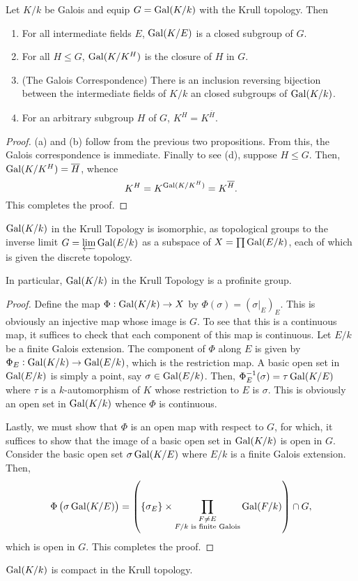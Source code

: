 \begin{theorem}[Krull]
    Let $K/k$ be Galois and equip $G = \operatorname{Gal}(K/k)$ with the Krull topology. Then 
    \begin{enumerate}[label=(\alph*)]
        \item For all intermediate fields $E$, $\operatorname{Gal}(K/E)$ is a closed subgroup of $G$.
        \item For all $H\le G$, $\operatorname{Gal}(K/K^H)$ is the closure of $H$ in $G$.
        \item (The Galois Correspondence) There is an inclusion reversing bijection between the intermediate fields of $K/k$ an closed subgroups of $\operatorname{Gal}(K/k)$.
        \item For an arbitrary subgroup $H$ of $G$, $K^H = K^{\overline H}$.
    \end{enumerate}
\end{theorem}
\begin{proof}
    (a) and (b) follow from the previous two propositions. From this, the Galois correspondence is immediate. Finally to see (d), suppose $H\le G$. Then, $\operatorname{Gal}(K/K^H) = \overline H$, whence 
    \begin{equation*}
        K^H = K^{\operatorname{Gal}(K/K^H)} = K^{\overline H}.
    \end{equation*}
    This completes the proof.
\end{proof}

\begin{theorem}
    $\operatorname{Gal}(K/k)$ in the Krull Topology is isomorphic, as topological groups to the inverse limit $G = \varprojlim\operatorname{Gal}(E/k)$ as a subspace of $X = \prod\operatorname{Gal}(E/k)$, each of which is given the discrete topology. 

    In particular, $\operatorname{Gal}(K/k)$ in the Krull Topology is a profinite group.
\end{theorem}
\begin{proof}
    Define the map $\Phi:\operatorname{Gal}(K/k)\to X$ by $\Phi(\sigma) = (\sigma|_E)_{E}$. This is obviously an injective map whose image is $G$. To see that this is a continuous map, it suffices to check that each component of this map is continuous. Let $E/k$ be a finite Galois extension. The component of $\Phi$ along $E$ is given by $\Phi_E:\operatorname{Gal}(K/k)\to\operatorname{Gal}(E/k)$, which is the restriction map. A basic open set in $\operatorname{Gal}(E/k)$ is simply a point, say $\sigma\in\operatorname{Gal}(E/k)$. Then, $\Phi_E^{-1}(\sigma) = \tau\operatorname{Gal}(K/E)$ where $\tau$ is a $k$-automorphism of $K$ whose restriction to $E$ is $\sigma$. This is obviously an open set in $\operatorname{Gal}(K/k)$ whence $\Phi$ is continuous.

    Lastly, we must show that $\Phi$ is an open map with respect to $G$, for which, it suffices to show that the image of a basic open set in $\operatorname{Gal}(K/k)$ is open in $G$. Consider the basic open set $\sigma\operatorname{Gal}(K/E)$ where $E/k$ is a finite Galois extension. Then, 
    \begin{equation*}
        \Phi\left(\sigma\operatorname{Gal}(K/E)\right) = \left(\{\sigma_E\}\times\prod_{\substack{F\ne E\\F/k\text{ is finite Galois}}}\operatorname{Gal}(F/k)\right)\cap G,
    \end{equation*}
    which is open in $G$. This completes the proof.
\end{proof}

\begin{corollary}
    $\operatorname{Gal}(K/k)$ is compact in the Krull topology.
\end{corollary}